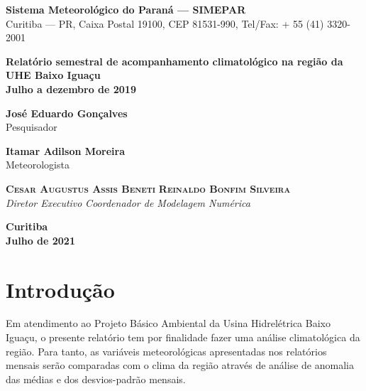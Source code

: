 \documentclass[a4paper,12pt]{article}
\begin{document}
\thispagestyle{empty}

\begin{flushleft}
\textbf{Sistema Meteorológico do Paraná --- SIMEPAR} \\
Curitiba --- PR, Caixa Postal 19100, CEP 81531-990, Tel/Fax: + 55 (41) 3320-2001
\end{flushleft}

\vspace{5.0cm}

\begin{center}
\fontsize{24pt}{28pt}\selectfont
\textbf{Relatório semestral de acompanhamento climatológico na região da UHE Baixo Iguaçu}\\
\vspace{18pt}
\textbf{Julho a dezembro de 2019
}\end{center}

\vspace{4.0cm}

\begin{center}
\textbf{José Eduardo Gonçalves}\\
Pesquisador\\

\vspace{12pt}

\textbf{Itamar Adilson Moreira}\\
Meteorologista\\
\end{center}

\vspace{12pt}

{\raggedleft \textbf{\textsc{Cesar Augustus Assis Beneti}}} \hfill \textsc{\textbf{Reinaldo Bonfim Silveira}}\\
\textit{Diretor Executivo} \hfill \textit{Coordenador de Modelagem Numérica}

\vspace{60pt}

\begin{center}
\textbf{Curitiba} \\
\textbf{Julho de 2021}
\end{center}

\newpage
\section{Introdução}

\hspace{0.5cm}Em atendimento ao Projeto Básico Ambiental da Usina Hidrelétrica Baixo Iguaçu, 
o presente relatório tem por finalidade fazer uma análise climatológica da região. Para tanto, as 
variáveis meteorológicas apresentadas nos relatórios mensais serão comparadas com o clima da região através de 
análise de anomalia das médias e dos desvios-padrão mensais.
\end{document}
